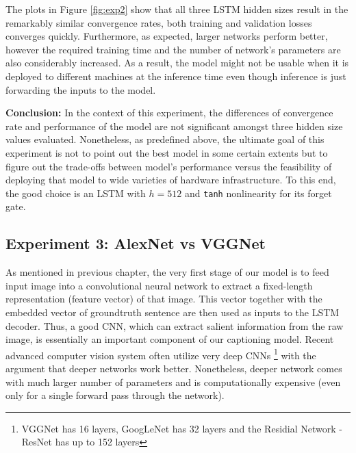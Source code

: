 \begin{itemize}
The plots in Figure \ref{fig:exp2} show that all three LSTM hidden sizes result in the remarkably similar convergence rates, both training and validation losses converges quickly. Furthermore, as expected, larger networks perform better,
however the required training time and the number of network's parameters are also considerably increased. As a result, the model might not be usable when it is deployed to different machines at the inference time even though inference is just forwarding the inputs to the model.


\textbf{Conclusion:} In the context of this experiment, the differences of convergence rate and performance of the model are not significant amongst three hidden size values evaluated. Nonetheless, as predefined above, the ultimate goal of this experiment is not to point out the best model in some certain extents but to figure out the trade-offs between model's performance versus the feasibility of deploying that model to wide varieties of hardware infrastructure. To this end, the good choice is an LSTM with $h = 512$ and \texttt{tanh} nonlinearity for its forget gate.

\subsection{Experiment 3: AlexNet vs VGGNet}
\label{exp:cnn}
As mentioned in previous chapter, the very first stage of our model is to feed input image into a convolutional neural network to extract a fixed-length representation (feature vector) of that image. This vector together with the embedded vector of groundtruth sentence are then used as inputs to the LSTM decoder. Thus, a good CNN, which can extract salient information from the raw image, is essentially an important component of our captioning model. Recent advanced computer vision system often utilize very deep CNNs \footnote{VGGNet has 16 layers, GoogLeNet has 32 layers and the Residial Network - ResNet has up to 152 layers} with the argument that deeper networks work better. Nonetheless, deeper network comes with much larger number of parameters and is computationally expensive (even only for a single forward pass through the network). 


\end{itemize}
